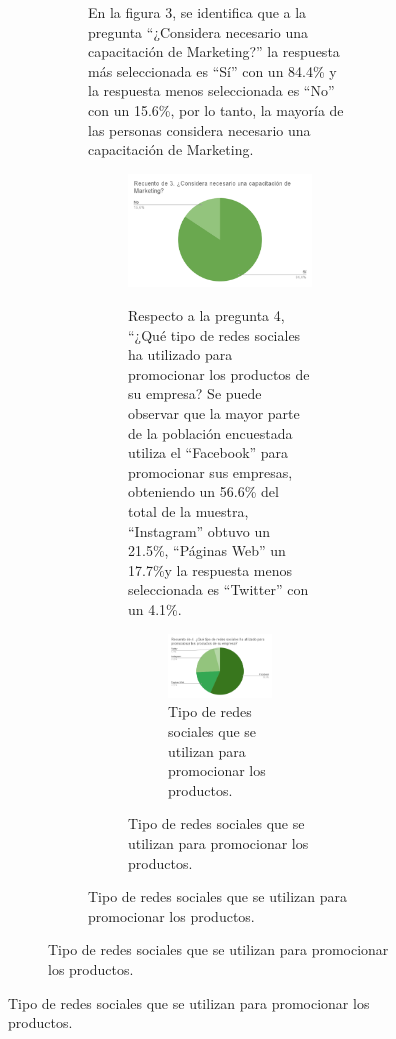 \documentclass[12pt]{difu100cia} %
\begin{document}
\begin{figure}[!htb]
\begin{figure}[!htb]
\begin{figure}[!htb]
	
En la figura 3, se identifica que a la pregunta “¿Considera necesario una capacitación de Marketing?” la respuesta más seleccionada es “Sí” con un 84.4\% y la respuesta menos seleccionada es “No” con un 15.6\%, por lo tanto, la mayoría de las personas considera necesario una capacitación de Marketing.

\begin{figure}[!htb]
	\centering
	\includegraphics[width=\linewidth]{Figura 4.png}
	\caption{Tipo de redes sociales que se utilizan para promocionar los productos.}
	
	
Respecto a la pregunta 4, “¿Qué tipo de redes sociales ha utilizado para promocionar los productos de su empresa?  Se puede observar que la mayor parte de la población encuestada utiliza el “Facebook” para promocionar sus empresas, obteniendo un 56.6\% del total de la muestra, “Instagram” obtuvo un 21.5\%, “Páginas Web” un 17.7\%y la respuesta menos seleccionada es “Twitter” con un 4.1\%. 


\begin{figure}[!htb]
	\centering
	\includegraphics[width=\linewidth]{Figura 5.png}
	\caption{Tipo de redes sociales que se utilizan para promocionar los productos.}
	

\end{figure}
\end{figure}
\end{figure}
\end{figure}
\end{figure}
\end{document}
